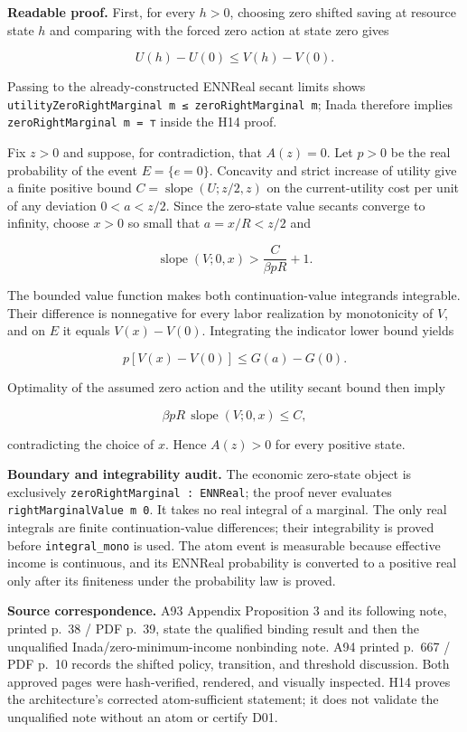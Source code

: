 \documentclass[
  11pt,
]{article}
\let\LedgerOriginalTexttt\texttt
\renewcommand{\texttt}[1]{{\small\LedgerOriginalTexttt{#1}}}
\begin{document}
\textbf{Readable proof.} First, for every \(h>0\), choosing zero shifted
saving at resource state \(h\) and comparing with the forced zero action
at state zero gives

\[U(h)-U(0)\leq V(h)-V(0).\]

Passing to the already-constructed ENNReal secant limits shows
\texttt{utilityZeroRightMarginal\ m\ ≤\ zeroRightMarginal\ m}; Inada
therefore implies \texttt{zeroRightMarginal\ m\ =\ ⊤} inside the H14
proof.

Fix \(z>0\) and suppose, for contradiction, that \(A(z)=0\). Let \(p>0\)
be the real probability of the event \(E=\{e=0\}\). Concavity and strict
increase of utility give a finite positive bound
\(C=\operatorname{slope}(U;z/2,z)\) on the current-utility cost per unit
of any deviation \(0<a<z/2\). Since the zero-state value secants
converge to infinity, choose \(x>0\) so small that \(a=x/R<z/2\) and

\[\operatorname{slope}(V;0,x)>\frac{C}{\beta pR}+1.\]

The bounded value function makes both continuation-value integrands
integrable. Their difference is nonnegative for every labor realization
by monotonicity of \(V\), and on \(E\) it equals \(V(x)-V(0)\).
Integrating the indicator lower bound yields

\[p[V(x)-V(0)]\leq G(a)-G(0).\]

Optimality of the assumed zero action and the utility secant bound then
imply

\[\beta pR\,\operatorname{slope}(V;0,x)\leq C,\]

contradicting the choice of \(x\). Hence \(A(z)>0\) for every positive
state.

\textbf{Boundary and integrability audit.} The economic zero-state
object is exclusively \texttt{zeroRightMarginal\ :\ ENNReal}; the proof
never evaluates \texttt{rightMarginalValue\ m\ 0}. It takes no real
integral of a marginal. The only real integrals are finite
continuation-value differences; their integrability is proved before
\texttt{integral\_mono} is used. The atom event is measurable because
effective income is continuous, and its ENNReal probability is converted
to a positive real only after its finiteness under the probability law
is proved.

\textbf{Source correspondence.} A93 Appendix Proposition 3 and its
following note, printed p.~38 / PDF p.~39, state the qualified binding
result and then the unqualified Inada/zero-minimum-income nonbinding
note. A94 printed p.~667 / PDF p.~10 records the shifted policy,
transition, and threshold discussion. Both approved pages were
hash-verified, rendered, and visually inspected. H14 proves the
architecture's corrected atom-sufficient statement; it does not validate
the unqualified note without an atom or certify D01.
\end{document}
